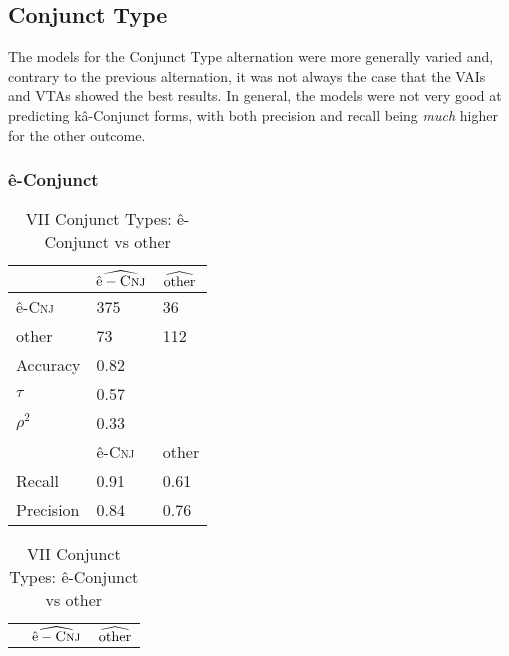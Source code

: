 \subsection{Conjunct Type}
The models for the Conjunct Type alternation were more generally varied and, contrary to the previous alternation, it was not always the case that the VAIs and VTAs showed the best results. In general, the models were not very good at predicting kâ-Conjunct forms, with both precision and recall being \textit{much} higher for the other outcome. 

\FloatBarrier

\subsubsection{ê-Conjunct}
\begin{table}[H]
  \begin{floatrow}[2]
    \makegapedcells
    \ttabbox%
    {                \begin{tabular}{lll}
                \toprule
                     & $\widehat{\textup{ê}-\textsc{Cnj}}$ & $\widehat{\textup{other}}$ \\
                \midrule
ê-\textsc{Cnj}   & 375               & 36                    \\
other            & 73                & 112                    \\
                     \midrule
                     \midrule
Accuracy          & 0.82               &                       \\
$\tau$            & 0.57               &                       \\
$\rho^{2}$        & 0.33               &                       \\
                     \midrule
                     \midrule
                     & ê-\textsc{Cnj}           & other           \\
Recall               & 0.91               & 0.61                  \\
Precision            & 0.84               & 0.76 \\
                \bottomrule
                \end{tabular}}
    {\caption{VII Conjunct Types: ê-Conjunct vs other}
      \label{viiivcms}}
    \hfill%
    \ttabbox%
    {                \begin{tabular}{lll}
                \toprule
                     & $\widehat{\textup{ê}-\textsc{Cnj}}$ & $\widehat{\textup{other}}$ \\

\end{tabular}}
\end{floatrow}
\end{table}
